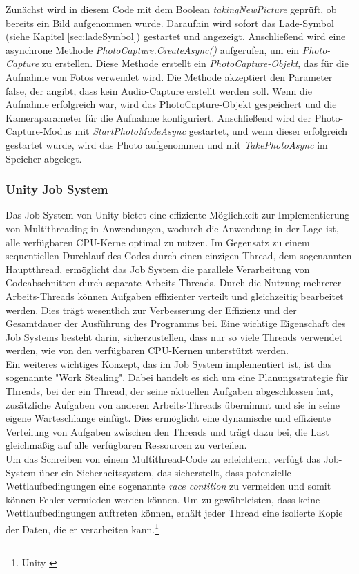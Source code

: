 Zunächst wird in diesem Code mit dem Boolean \textit{takingNewPicture} geprüft, ob bereits ein Bild aufgenommen wurde. Daraufhin wird sofort das Lade-Symbol (siehe Kapitel \ref{sec:ladeSymbol}) gestartet und angezeigt. Anschließend wird eine asynchrone Methode \textit{PhotoCapture.CreateAsync()} aufgerufen, um ein \textit{Photo-Capture} zu erstellen. Diese Methode erstellt ein \textit{PhotoCapture-Objekt}, das für die Aufnahme von Fotos verwendet wird. Die Methode akzeptiert den Parameter false, der angibt, dass kein Audio-Capture erstellt werden soll. Wenn die Aufnahme erfolgreich war, wird das PhotoCapture-Objekt gespeichert und die Kameraparameter für die Aufnahme konfiguriert. Anschließend wird der Photo-Capture-Modus mit \textit{StartPhotoModeAsync} gestartet, und wenn dieser erfolgreich gestartet wurde, wird das Photo aufgenommen und mit \textit{TakePhotoAsync} im Speicher abgelegt.

\subsubsection{\label{sec:JobSystem}Unity Job System}
Das Job System von Unity bietet eine effiziente Möglichkeit zur Implementierung von Multithreading in Anwendungen, wodurch die Anwendung in
der Lage ist, alle verfügbaren CPU-Kerne optimal zu nutzen. Im Gegensatz zu einem sequentiellen Durchlauf des Codes durch einen einzigen Thread, dem sogenannten Hauptthread, ermöglicht das Job System die parallele Verarbeitung von Codeabschnitten durch separate Arbeits-Threads. Durch die Nutzung mehrerer Arbeits-Threads können Aufgaben effizienter verteilt und gleichzeitig bearbeitet werden. Dies trägt wesentlich zur Verbesserung der Effizienz und der Gesamtdauer der Ausführung des Programms bei. Eine wichtige Eigenschaft des Job Systems besteht darin, sicherzustellen, dass nur so viele Threads verwendet werden, wie von den verfügbaren CPU-Kernen unterstützt werden.\\
Ein weiteres wichtiges Konzept, das im Job System implementiert ist, ist das sogenannte "Work Stealing". Dabei handelt es sich um eine Planungsstrategie für Threads, bei der ein Thread, der seine aktuellen Aufgaben abgeschlossen hat, zusätzliche Aufgaben von anderen Arbeits-Threads übernimmt und sie in seine eigene Warteschlange einfügt. Dies ermöglicht eine dynamische und effiziente Verteilung von Aufgaben zwischen den Threads und trägt dazu bei, die Last gleichmäßig auf alle verfügbaren Ressourcen zu verteilen. \\
Um das Schreiben von einem Multithread-Code zu erleichtern, verfügt das Job-System über ein Sicherheitssystem, das sicherstellt, dass potenzielle Wettlaufbedingungen eine sogenannte \textit{race contition} zu vermeiden und somit können Fehler vermieden werden können. Um zu gewährleisten, dass keine Wettlaufbedingungen auftreten können, erhält jeder Thread eine isolierte Kopie der Daten, die er verarbeiten kann.\protect\footnote{Unity \cite{Job System}}


